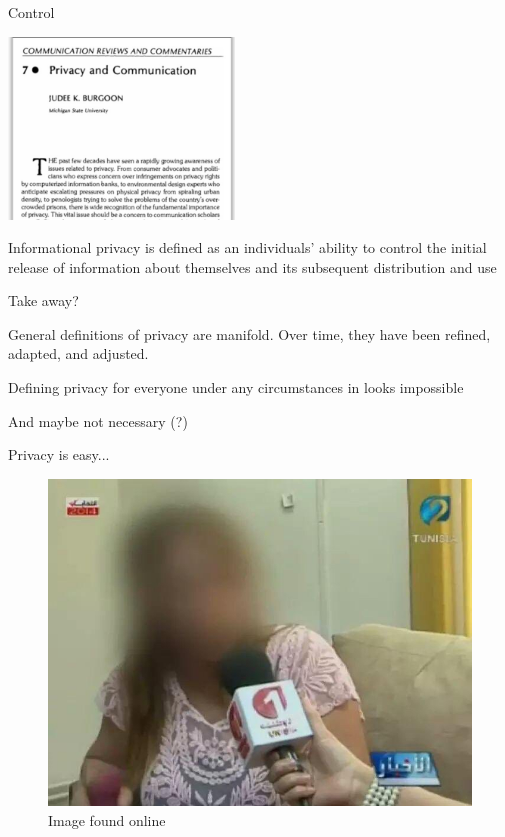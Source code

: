 \documentclass[12pt,aspectratio=169,handout]{beamer}
\begin{document}
\begin{frame}{Control}

\includegraphics[width=6cm]{img/burgoon.jpg}

Informational privacy is defined as an individuals' ability to control the initial
release of information about themselves and its subsequent distribution and use



\end{frame}


\begin{frame}{Take away?}

General definitions of privacy are manifold. Over time, they have been refined, adapted, and adjusted.

Defining privacy for everyone under any circumstances in looks impossible

And maybe not necessary (?)


\end{frame}


\begin{frame}{Privacy is easy...}
\begin{figure}
\includegraphics[width=0.70\linewidth]{img/Fyyh8scXgAg2xYx}
\caption{Image found online}
\end{figure}
\end{frame}
\end{document}
